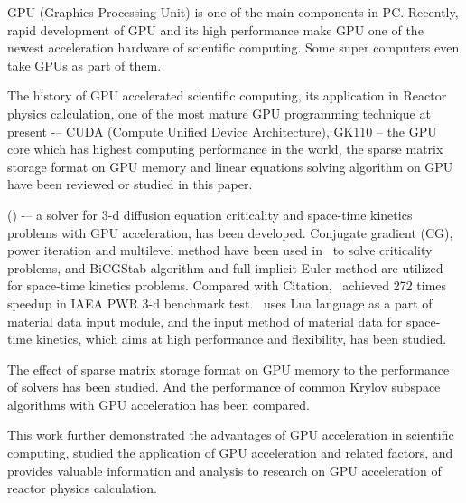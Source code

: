 
\begin{eabstract}

GPU (Graphics Processing Unit) is one of the main components in PC.
 Recently, rapid development of GPU and its high performance make 
 GPU one of the newest acceleration hardware of scientific computing. 
 Some super computers even take GPUs as part of them.

The history of GPU accelerated scientific computing, 
its application in Reactor physics calculation, 
one of the most mature GPU programming technique at present 
-– CUDA (Compute Unified Device Architecture), 
GK110 -- the GPU core which has highest computing performance
in the world, the sparse matrix storage format on GPU memory 
and linear equations solving algorithm on GPU have been 
reviewed or studied in this paper.

\ProgramName (\ProgramFullName) -– a solver for 3-d diffusion
 equation criticality and space-time kinetics problems with
  GPU acceleration, has been developed. Conjugate gradient (CG),
   power iteration and multilevel method have been used in 
   \ProgramName \ to solve criticality problems, and BiCGStab 
   algorithm and full implicit Euler method are utilized for 
   space-time kinetics problems. Compared with Citation, 
   \ProgramName \ achieved 272 times speedup in IAEA PWR 3-d benchmark test.
\ProgramName \ uses Lua language as a part of material data input module,
 and the  input method of material data for space-time kinetics,
  which aims at high performance and flexibility, has been studied. 

The effect of sparse matrix storage format on GPU memory to the performance
 of solvers has been studied. And the performance of
  common Krylov subspace algorithms with GPU acceleration has been compared.

This work further demonstrated the advantages of GPU acceleration
 in scientific computing, studied the application of GPU acceleration
 and related factors, and provides valuable information
 and analysis to research on GPU acceleration of reactor physics calculation.

\end{eabstract}

